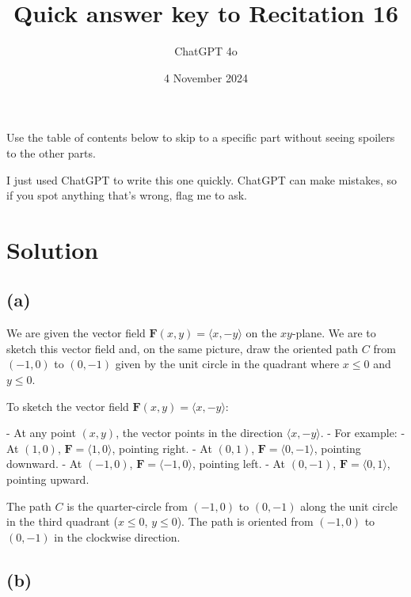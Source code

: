 \documentclass[11pt]{article}
\begin{document}
\title{Quick answer key to Recitation 16}
\author{ChatGPT 4o}
\date{4 November 2024}
\maketitle

Use the table of contents below to skip to a specific part
without seeing spoilers to the other parts.

I just used ChatGPT to write this one quickly.
ChatGPT can make mistakes, so if you spot anything that's wrong, flag me to ask.

\tableofcontents



\newpage

\section{Solution}

\newpage

\subsection{(a)}

We are given the vector field $\mathbf{F}(x, y) = \langle x, -y \rangle$ on the $xy$-plane. We are to sketch this vector field and, on the same picture, draw the oriented path $C$ from $(-1, 0)$ to $(0, -1)$ given by the unit circle in the quadrant where $x \leq 0$ and $y \leq 0$.

To sketch the vector field $\mathbf{F}(x, y) = \langle x, -y \rangle$:

- At any point $(x, y)$, the vector points in the direction $\langle x, -y \rangle$.
- For example:
  - At $(1, 0)$, $\mathbf{F} = \langle 1, 0 \rangle$, pointing right.
  - At $(0, 1)$, $\mathbf{F} = \langle 0, -1 \rangle$, pointing downward.
  - At $(-1, 0)$, $\mathbf{F} = \langle -1, 0 \rangle$, pointing left.
  - At $(0, -1)$, $\mathbf{F} = \langle 0, 1 \rangle$, pointing upward.

The path $C$ is the quarter-circle from $(-1, 0)$ to $(0, -1)$ along the unit circle in the third quadrant ($x \leq 0$, $y \leq 0$). The path is oriented from $(-1, 0)$ to $(0, -1)$ in the clockwise direction.

\newpage

\subsection{(b)}
\end{document}
